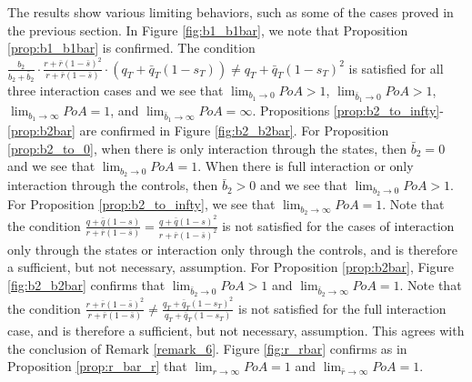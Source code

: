 \documentclass[11pt]{article}
\begin{document}
The results show various limiting behaviors, such as some of the cases proved in the previous section. In Figure \ref{fig:b1_b1bar}, we note that Proposition \ref{prop:b1_b1bar} is confirmed. The condition $\frac{b_2}{b_2+\bar{b}_2}\cdot \frac{r + \bar{r}(1- \bar{s})^2}{r + \bar{r}(1-\bar{s})}\cdot (q_T+\bar{q}_T(1-s_T)) \neq q_T+\bar{q}_T(1-s_T)^2$ is satisfied for all three interaction cases and we see that $\lim_{b_1 \to 0}PoA >1$, $\lim_{\bar{b}_1 \to 0}PoA>1$, $\lim_{b_1 \to \infty}PoA = 1$, and $\lim_{\bar{b}_1 \to \infty}PoA = \infty$. Propositions \ref{prop:b2_to_infty}-\ref{prop:b2bar} are confirmed in Figure \ref{fig:b2_b2bar}. For Proposition \ref{prop:b2_to_0}, when there is only interaction through the states, then $\bar{b}_2=0$ and we see that $\lim_{b_2 \to 0}PoA= 1$. When there is full interaction or only interaction through the controls, then $\bar{b}_2>0$ and we see that $\lim_{b_2 \to 0}PoA>1$. For Proposition \ref{prop:b2_to_infty}, we see that $\lim_{b_2 \to \infty}PoA= 1$. Note that the condition $\frac{q + \bar{q}(1-s)}{r + \bar{r}(1-\bar{s})}= \frac{q + \bar{q}(1-s)^2}{r + \bar{r}(1-\bar{s})^2}$ is  not satisfied for the cases of interaction only through the states or interaction only through the controls, and is therefore a sufficient, but not necessary, assumption. For Proposition \ref{prop:b2bar}, Figure \ref{fig:b2_b2bar} confirms that $\lim_{\bar{b}_2 \to 0}PoA>1$ and $\lim_{\bar{b}_2 \to \infty}PoA= 1$. Note that the condition $\frac{r + \bar{r}(1- \bar{s})^2}{r + \bar{r}(1-\bar{s})} \neq \frac{q_T+\bar{q}_T(1-s_T)^2}{q_T+\bar{q}_T(1-s_T)}$ is not satisfied for the full interaction case, and is therefore a sufficient, but not necessary, assumption. This agrees with the conclusion of Remark \ref{remark_6}. Figure \ref{fig:r_rbar} confirms as in Proposition \ref{prop:r_bar_r} that $\lim_{r \to \infty}PoA= 1$ and $\lim_{\bar{r} \to \infty}PoA= 1$.
\end{document}
